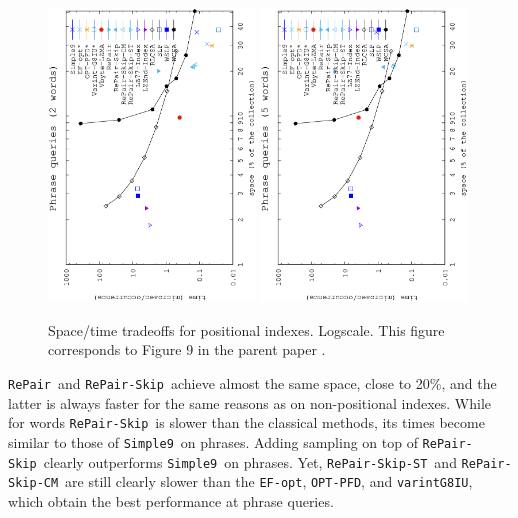 \documentclass[review]{elsarticle}
\newcommand{\simplen}{\texttt{Simple9}}
\newcommand{\repairNo}{\texttt{RePair}}
\newcommand{\repairSkip}{\texttt{RePair-Skip}}
\newcommand{\repairSkipCM}{\texttt{RePair-Skip-CM}}
\newcommand{\repairSkipST}{\texttt{RePair-Skip-ST}}
\newcommand{\efopt}{\texttt{EF-opt}}
\newcommand{\optpfd}{\texttt{OPT-PFD}}
\newcommand{\varint}{\texttt{varintG8IU}}
\begin{document}
\begin{figure}[t]
\begin{center}
\includegraphics[angle=-90,width=0.49\textwidth]{../figures/f4/phrases2-2/locate-2_2.eps}
\includegraphics[angle=-90,width=0.49\textwidth]{../figures/f4/phrases5-5/locate-5_5.eps}
\caption{Space/time tradeoffs for positional indexes. Logscale. This figure corresponds to Figure 9 in the parent paper \cite{CFMNis16.3}.}
\label{fig:pos2.2}
\end{center}
\end{figure}



\repairNo\ and \repairSkip\ achieve almost the same space, %
close to 20\%,
and the latter is always faster for the same reasons as on
non-positional indexes. While for words \repairSkip\ is slower than the 
classical methods, its times become similar to those of \simplen\ on phrases. Adding sampling on 
top of \repairSkip\ clearly outperforms \simplen\ on phrases. 
Yet, \repairSkipST\ and \repairSkipCM\ are still clearly slower than the \efopt, \optpfd, and \varint, which obtain the best performance at phrase queries.
\end{document}
